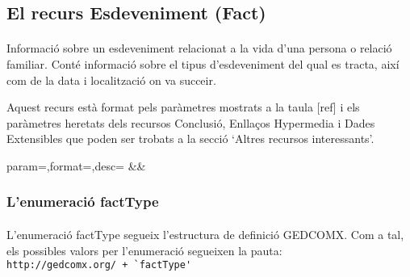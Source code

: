 \subsection{El recurs Esdeveniment (Fact)}

    \paragraph{}
    Informació sobre un esdeveniment relacionat a la vida d'una persona o relació familiar. Conté informació sobre el tipus d'esdeveniment del qual es tracta, així com de la data i localització on va succeir.

    Aquest recurs està format pels paràmetres mostrats a la taula [ref] i els paràmetres heretats dels recursos Conclusió, Enllaços Hypermedia i Dades Extensibles que poden ser trobats a la secció `Altres recursos interessants'.

    \begin{center}
             {param=\param,format=\format,desc=\desc}
             {\param&\format&\desc}
     \end{center}


     \subsubsection{L'enumeració factType}

     \paragraph{}
     L'enumeració factType segueix l'estructura de definició GEDCOMX. Com a tal, els possibles valors per l'enumeració segueixen la pauta:\\\verb|http://gedcomx.org/ + `factType'|

